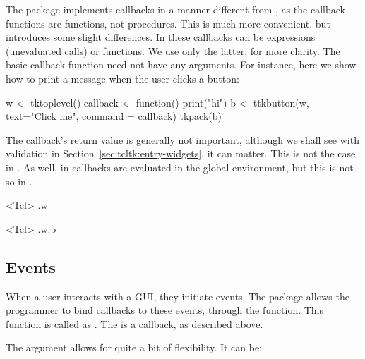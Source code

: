 The  package implements callbacks in a manner different
from \TK, as the callback functions are \R\/ functions, not \TK\/
procedures. This is much more convenient, but introduces some slight
differences.  In  these callbacks can be expressions
(unevaluated calls) or functions. We use only the latter, for more
clarity. The basic callback function need not have any arguments. For
instance, here we show how to print a message when the user clicks a
button:
\begin{Schunk}
\begin{Sinput}
 w <- tktoplevel()
 callback <- function() print("hi")
 b <- ttkbutton(w, text="Click me", command = callback)
  tkpack(b)
\end{Sinput}
\end{Schunk}


The callback's return value is generally not important, although we
shall see with validation in Section~\ref{sec:tcltk:entry-widgets}, it
can matter. This is not the case in \Tk. As well, in \Tk\/ callbacks
are evaluated in the global environment, but this is not so in
.

\begin{Schunk}
\begin{Soutput}
<Tcl> .w 
\end{Soutput}
\begin{Soutput}
<Tcl> .w.b 
\end{Soutput}
\end{Schunk}
\subsection{Events}
\label{sec:tcltk:events}


When a user interacts with a GUI, they initiate events. The  package allows the programmer to bind callbacks to these events, through the  function. This function is called as . The  is a callback, as described above.

The  argument allows for quite a bit of flexibility. It can be:

